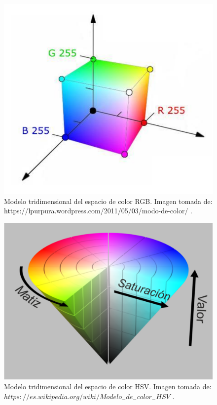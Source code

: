 \begin{figure}
	\centering		
	\includegraphics[scale=0.8]{images/RGB_model.pdf}
	\caption{Modelo tridimensional del espacio de color RGB. Imagen tomada de: https://lpurpura.wordpress.com/2011/05/03/modo-de-color/ .}		
\end{figure}

\begin{figure}
	\centering		
	\includegraphics[scale=0.4]{images/hsv_space.pdf}
	\caption{Modelo tridimensional del espacio de color HSV. Imagen tomada de: $https://es.wikipedia.org/wiki/Modelo_-de_-color_-HSV$ .}		
\end{figure}

